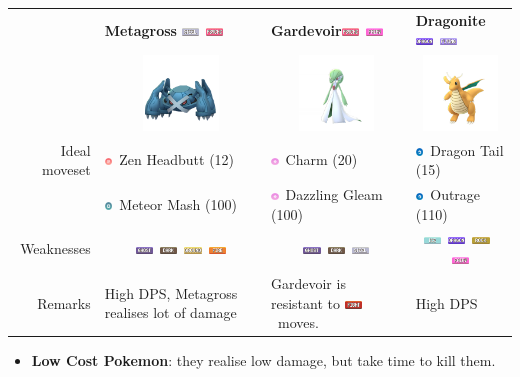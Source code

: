 \documentclass[12pt]{beamer}
\newcommand{\fightingfull}{\includegraphics[height=0.2cm]{../../images/type/full/Fighting.png}}
\newcommand{\darkfull}{\includegraphics[height=0.2cm]{../../images/type/full/Dark.png}}
\newcommand{\fairyfull}{\includegraphics[height=0.2cm]{../../images/type/full/Fairy.png}}
\newcommand{\firefull}{\includegraphics[height=0.2cm]{../../images/type/full/Fire.png}}
\newcommand{\flyingfull}{\includegraphics[height=0.2cm]{../../images/type/full/Flying.png}}
\newcommand{\ghostfull}{\includegraphics[height=0.2cm]{../../images/type/full/Ghost.png}}
\newcommand{\dragonfull}{\includegraphics[height=0.2cm]{../../images/type/full/Dragon.png}}
\newcommand{\groundfull}{\includegraphics[height=0.2cm]{../../images/type/full/Ground.png}}
\newcommand{\icefull}{\includegraphics[height=0.2cm]{../../images/type/full/Ice.png}}
\newcommand{\psychicfull}{\includegraphics[height=0.2cm]{../../images/type/full/Psychic.png}}
\newcommand{\rockfull}{\includegraphics[height=0.2cm]{../../images/type/full/Rock.png}}
\newcommand{\steelfull}{\includegraphics[height=0.2cm]{../../images/type/full/Steel.png}}
\newcommand{\dragonsimp}{\includegraphics[height=0.2cm]{../../images/type/simplified/dragon.png}}
\newcommand{\psysimp}{\includegraphics[height=0.2cm]{../../images/type/simplified/psy.png}}
\newcommand{\steelsimp}{\includegraphics[height=0.2cm]{../../images/type/simplified/steel.png}}
\newcommand{\fairysimp}{\includegraphics[height=0.2cm]{../../images/type/simplified/fairy.png}}
\begin{document}
\begin{frame}
\begin{block}{}
\begin{footnotesize}
\begin{center}
\begin{tabular}{rp{3.2cm}p{3.2cm}p{3.2cm}}
& \textbf{Metagross} \hfill \steelfull~\psychicfull &  \textbf{Gardevoir}\hfill \psychicfull~\fairyfull & \textbf{Dragonite} \hfill \dragonfull~\flyingfull \\ 
&\multicolumn{1}{c}{\includegraphics[width=2cm]{../../images/pokemon/Metagross}} &
\multicolumn{1}{c}{\includegraphics[width=2cm]{../../images/pokemon/Gardevoir}} &
\multicolumn{1}{c}{\includegraphics[width=2cm]{../../images/pokemon/Dragonite}}   \\ \hline
Ideal moveset &  \psysimp~Zen Headbutt (12) &  \fairysimp~Charm (20) &  \dragonsimp~Dragon Tail (15)\\ 
&\steelsimp~Meteor Mash (100) & \fairysimp~Dazzling Gleam (100) & \dragonsimp~Outrage (110)  \\ \hline
Weaknesses & \multicolumn{1}{c}{\ghostfull~\darkfull~\groundfull~\firefull} & \multicolumn{1}{c}{\ghostfull~\darkfull~\steelfull} & \multicolumn{1}{c}{\icefull~\dragonfull~\rockfull~\fairyfull}  \\ \hline
Remarks & High DPS, Metagross realises lot of damage & Gardevoir is resistant to \fightingfull~moves. & High DPS \\ 
\end{tabular}
\end{center}

\begin{itemize}
  \item \textbf{Low Cost Pokemon}: they realise low damage, but take time to kill them.
\end{itemize}


\end{footnotesize}
\end{block}
\end{frame}
\end{document}
